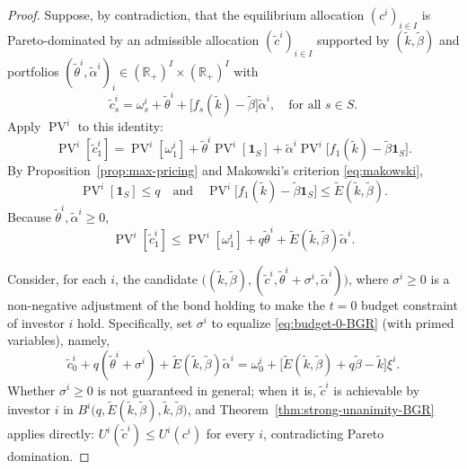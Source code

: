 \documentclass[11pt,a4paper,oneside]{book}
\def\R{\mathbb{R}}
\def\1{\mathbf{1}}
\def\leq{\leqslant}
\def\geq{\geqslant}
\def\et{\quad \text{and} \quad}
\DeclareMathOperator{\PV}{PV}
\theoremstyle{plain}
\theoremstyle{definition}
\theoremstyle{remark}
\numberwithin{equation}{chapter}
\begin{document}
\begin{proof}
Suppose, by contradiction, that the equilibrium allocation $(c^i)_{i \in I}$ is Pareto-dominated by an admissible allocation $(\widetilde{c}^i)_{i \in I}$ supported by $(\widetilde{k}, \widetilde{\beta})$ and portfolios $(\widetilde{\theta}^i, \widetilde{\alpha}^i)_i \in (\R_+)^I \times (\R_+)^I$ with
\begin{equation*}
  \widetilde{c}^i_s = \omega^i_s + \widetilde{\theta}^i + \bigl[ f_s(\widetilde{k}) - \widetilde{\beta} \bigr] \widetilde{\alpha}^i, \quad \text{for all $s\in S$}.
\end{equation*}
Apply $\PV^i$ to this identity:
\begin{equation*}
  \PV^i[\widetilde{c}^i_1]
  = \PV^i[\omega^i_1] + \widetilde{\theta}^i \PV^i[\1_S] + \widetilde{\alpha}^i \PV^i\bigl[ f_1(\widetilde{k}) - \widetilde{\beta} \1_S \bigr].
\end{equation*}
By Proposition~\ref{prop:max-pricing} and Makowski's criterion \eqref{eq:makowski},
\begin{equation*}
  \PV^i[\1_S] \leq q
  \et
  \PV^i\bigl[ f_1(\widetilde{k}) - \widetilde{\beta} \1_S \bigr] \leq \widetilde{E}(\widetilde{k}, \widetilde{\beta}).
\end{equation*}
Because $\widetilde{\theta}^i, \widetilde{\alpha}^i \geq 0$,
\begin{equation}\label{eq:PV-ct}
  \PV^i[\widetilde{c}^i_1] \leq \PV^i[\omega^i_1] + q \widetilde{\theta}^i + \widetilde{E}(\widetilde{k}, \widetilde{\beta}) \widetilde{\alpha}^i.
\end{equation}

Consider, for each $i$, the candidate $\bigl( (\widetilde{k}, \widetilde{\beta}), (\widetilde{c}^i, \widetilde{\theta}^i + \sigma^i, \widetilde{\alpha}^i) \bigr)$, where $\sigma^i \geq 0$ is a non-negative adjustment of the bond holding to make the $t=0$ budget constraint of investor $i$ hold.
Specifically, set $\sigma^i$ to equalize \eqref{eq:budget-0-BGR} (with primed variables), namely,
\begin{equation*}
  \widetilde{c}^i_0 + q (\widetilde{\theta}^i + \sigma^i) + \widetilde{E}(\widetilde{k}, \widetilde{\beta}) \widetilde{\alpha}^i
  =
  \omega^i_0 + \bigl[ \widetilde{E}(\widetilde{k}, \widetilde{\beta}) + q \widetilde{\beta} - \widetilde{k} \bigr] \xi^i.
\end{equation*}
Whether $\sigma^i \geq 0$ is not guaranteed in general; when it is, $\widetilde{c}^i$ is achievable by investor $i$ in $B^i\bigl(q, \widetilde{E}(\widetilde{k}, \widetilde{\beta}), \widetilde{k}, \widetilde{\beta}\bigr)$, and Theorem~\ref{thm:strong-unanimity-BGR} applies directly: $U^i(\widetilde{c}^i) \leq U^i(c^i)$ for every $i$, contradicting Pareto domination.


\end{proof}
\end{document}
